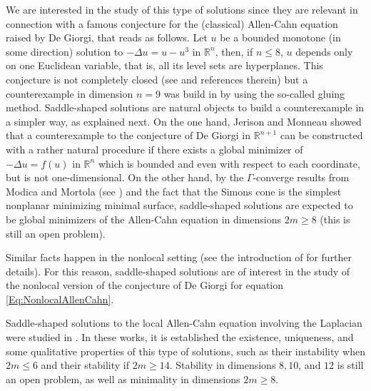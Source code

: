 \documentclass[12pt,reqno]{amsart}
\theoremstyle{definition}
\theoremstyle{remark}
\newcommand{\con}[1]{\mathbb{#1}}
\newcommand{\R}{\con{R}} %
\numberwithin{equation}{section}
\begin{document}
	We are interested in the study of this type of solutions since they are relevant in connection with a famous conjecture for the (classical) Allen-Cahn equation raised by De Giorgi, that reads as follows. Let $u$ be a bounded monotone (in some direction) solution to $-\Delta u = u - u^3$ in $\R^n$, then, if $n \leq 8$, $u$ depends only on one Euclidean variable, that is, all its level sets are hyperplanes. This conjecture is not completely closed (see \cite{FarinaValdinoci-DeGiorgi} and references therein) but a counterexample in dimension $n=9$ was build in \cite{delPinoKowalczykWei} by using the so-called gluing method. Saddle-shaped solutions are natural objects to build a counterexample in a simpler way, as explained next. On the one hand, Jerison and Monneau \cite{JerisonMonneau} showed that a counterexample to the conjecture of De Giorgi in $\R^{n+1}$ can be constructed with a rather natural procedure if there exists a global minimizer of $-\Delta u = f(u)$ in $\R^n$ which is bounded and even with respect to each coordinate, but is not one-dimensional. On the other hand, by the $\Gamma$-converge results from Modica and Mortola (see \cite{Modica,ModicaMortola}) and the fact that the Simons cone is the simplest nonplanar minimizing minimal surface, saddle-shaped solutions are expected to be global minimizers of the Allen-Cahn equation in dimensions $2m\geq 8$ (this is still an open problem).
	
	Similar facts happen in the nonlocal setting (see the introduction of \cite{Felipe-Sanz-Perela:SaddleFractional} for further details). For this reason, saddle-shaped solutions are of interest in the study of the nonlocal version of the conjecture of De Giorgi for equation \eqref{Eq:NonlocalAllenCahn}.
	
	Saddle-shaped solutions to the local Allen-Cahn equation involving the Laplacian were studied in \cite{DangFifePeletier, Schatzman, CabreTerraI,CabreTerraII, Cabre-Saddle}. In these works, it is established the existence, uniqueness, and some qualitative properties of this type of solutions, such as their instability when $2m\leq 6$ and their stability if $2m\geq 14$. Stability in dimensions $8, 10$, and $12$ is still an open problem, as well as minimality in dimensions $2m\geq 8$.
	
\end{document}
